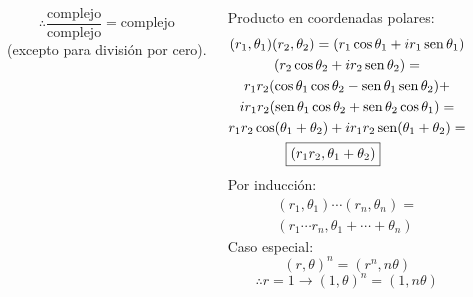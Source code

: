 \documentclass[9pt, aspectratio=169]{beamer}
\begin{document}
\begin{frame}
\begin{columns}[t]
		\[ \therefore \frac{\text{complejo}}{\text{complejo}} = \text{complejo} \]
		(excepto para división por cero).

		Producto en coordenadas polares:
		\begin{multline*}
			(r_1, \theta_1)(r_2, \theta_2) = (r_1 \cos \theta_1 + i r_1 \operatorname{sen} \theta_1) \\
			(r_2 \cos \theta_2 + i r_2 \operatorname{sen} \theta_2)= \\
			r_1 r_2 (\cos \theta_1 \cos \theta_2 - \operatorname{sen} \theta_1 \operatorname{sen} \theta_2) + \\
			i r_1 r_2 (\operatorname{sen} \theta_1 \cos \theta_2 + \operatorname{sen} \theta_2 \cos \theta_1) = \\
			r_1 r_2 \cos(\theta_1 + \theta_2) + i r_1 r_2 \operatorname{sen}(\theta_1 + \theta_2) = \\
			\boxed{ (r_1 r_2, \theta_1 + \theta_2) } \qquad
		\end{multline*}
		Por inducción:
		\begin{multline*}
			(r_1, \theta_1) \cdots (r_n, \theta_n) = \\
			(r_1 \cdots r_n, \theta_1 + \cdots + \theta_n)
		\end{multline*}
		Caso especial:
		\[ (r, \theta)^n = (r^n, n \theta) \]
		\[ \therefore r = 1 \rightarrow (1, \theta)^n = (1, n \theta) \]
	\end{columns}
\end{frame}
\end{document}
